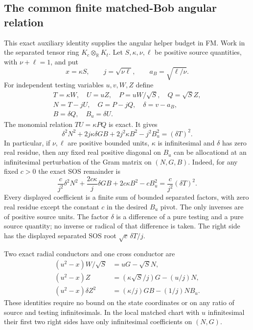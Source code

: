 \subsection{The common finite matched-Bob angular relation}

\label{component:pe55ec4890781}

\label{pe55ec4890781:sec:new-c144-matched-budget}

This exact auxiliary identity supplies the angular helper budget in FM.
Work in the separated tensor ring $K_c\otimes_{\mathbb R}K_t$.
Let $S,\kappa,\nu,\ell$ be positive source quantities, with
$\nu+\ell=1$, and put
\[
 x=\kappa S,\qquad j=\sqrt{\nu\ell},\qquad
 a_B=\sqrt{\ell/\nu}.
 \tag{MB1}
\]
For independent testing variables $u,v,W,Z$ define
\[
\begin{gathered}
 T=\kappa W,\quad U=uZ,\quad P=uW/\sqrt S,\quad Q=\sqrt S Z,\\
 N=T-jU,\quad G=P-jQ,\quad \delta=v-a_B,\\
 B=\delta Q,\quad B_u=\delta U.
\end{gathered}
 \tag{MB2}
\]
The monomial relation $TU=\kappa PQ$ is exact. It gives
\[
 \delta^2N^2+2j\kappa\delta GB+2j^2\kappa B^2-j^2B_u^2
       =(\delta T)^2.
 \tag{MB3}
\]
In particular, if $\nu,\ell$ are positive bounded units,
$\kappa$ is infinitesimal and $\delta$ has zero real residue,
then any fixed real positive diagonal on $B_u$ can be allocationd
at an infinitesimal perturbation of the Gram matrix on $(N,G,B)$.
Indeed, for any fixed $c>0$ the exact SOS remainder is
\[
 \frac{c}{j^2}\delta^2N^2+
       \frac{2c\kappa}{j}\delta GB+2c\kappa B^2-cB_u^2
       =\frac{c}{j^2}(\delta T)^2.
 \tag{MB4}
\]
Every displayed coefficient is a finite sum of bounded separated
factors, with zero real residue except the constant $c$ in the
desired $B_u$ pivot. The only inverses are of positive source units.
The factor $\delta$ is a difference of a pure testing and a pure
source quantity; no inverse or radical of that difference is taken.
The right side has the displayed separated SOS root
$\sqrt c\,\delta T/j$.

Two exact radial conductors and one cross conductor are
\[
 \begin{split}
 (u^2-x)W/\sqrt S&=uG-\sqrt S N,\\
 (u^2-x)Z&=(\kappa\sqrt S/j)G-(u/j)N,\\
 (u^2-x)\delta Z^2&=(\kappa/j)GB-(1/j)NB_u.
 \end{split}
 \tag{MB5}
\]
These identities require no bound on the state coordinates or on
any ratio of source and testing infinitesimals. In the local matched
chart with $u$ infinitesimal their first two right sides have only
infinitesimal coefficients on $(N,G)$.



